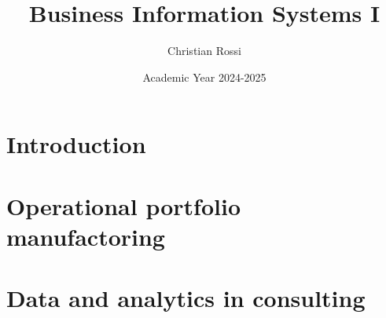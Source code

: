\documentclass[12pt, a4paper]{report}
\title{\textbf{Business Information Systems I}}
\author{Christian Rossi}
\date{Academic Year 2024-2025}
\begin{document}
    \maketitle

    

    \cleardoublepage{}

    \tableofcontents

    \cleardoublepage{}

    \chapter{Introduction}
    
    
    
    

    \chapter{Operational portfolio manufactoring}
    




    \chapter{Data and analytics in consulting}
    
    
\end{document}
